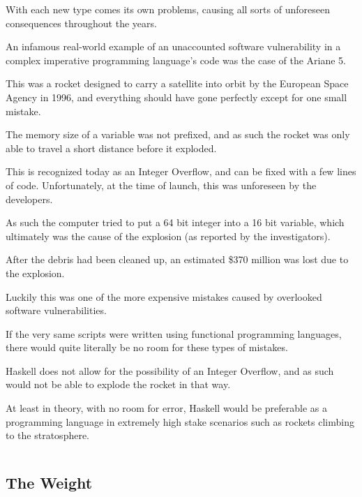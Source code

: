 \documentclass{article}
\begin{document}
\medskip\noindent
With each new type comes its own problems, causing all sorts of unforeseen consequences throughout the years. 

\medskip\noindent
An infamous real-world example of an unaccounted software vulnerability in a complex imperative programming language's code was the case of the Ariane 5.

\medskip\noindent
\cite{FB} This was a rocket designed to carry a satellite into orbit by the European Space Agency in 1996, and everything should have gone perfectly except for one small mistake. 

\medskip\noindent
The memory size of a variable was not prefixed, and as such the rocket was only able to travel a short distance before it exploded. 

\medskip\noindent
This is recognized today as an Integer Overflow, and can be fixed with a few lines of code. Unfortunately, at the time of launch, this was unforeseen by the developers.

\medskip\noindent
As such the computer tried to put a 64 bit integer into a 16 bit variable, which ultimately was the cause of the explosion (as reported by the investigators). 

\medskip\noindent
After the debris had been cleaned up, an estimated \$370 million was lost due to the explosion. 

\medskip\noindent
Luckily this was one of the more expensive mistakes caused by overlooked software vulnerabilities. 

\medskip\noindent
If the very same scripts were written using functional programming languages, there would quite literally be no room for these types of mistakes.  

\medskip\noindent
Haskell does not allow for the possibility of an Integer Overflow, and as such would not be able to explode the rocket in that way.

\medskip\noindent
At least in theory, with no room for error, Haskell would be preferable as a programming language in extremely high stake scenarios such as rockets climbing to the stratosphere. 

\medskip\medskip
\begin{lstlisting}
\end{lstlisting}

\medskip

\subsection{The Weight}
\medskip\medskip
\hspace{\parindent} 
\end{document}
